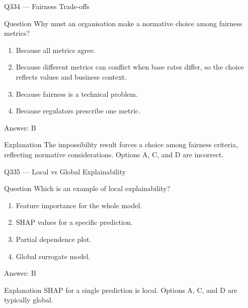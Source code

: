 \documentclass[aspectratio=169,8pt]{beamer}
\begin{document}
\begin{frame}{Q334 --- Fairness Trade-offs}
	\begin{block}{Question}
		Why must an organisation make a normative choice among fairness metrics?
		\begin{enumerate}
			\item Because all metrics agree.
			\item Because different metrics can conflict when base rates differ, so the choice reflects values and business context.
			\item Because fairness is a technical problem.
			\item Because regulators prescribe one metric.
	\end{enumerate}  \end{block}
	\begin{exampleblock}{Answer: B}\end{exampleblock}
	\begin{block}{Explanation}
		The impossibility result forces a choice among fairness criteria, reflecting normative considerations. Options A, C, and D are incorrect.
	\end{block}
\end{frame}

\begin{frame}{Q335 --- Local vs Global Explainability}
	\begin{block}{Question}
		Which is an example of local explainability?
		\begin{enumerate}
			\item Feature importance for the whole model.
			\item SHAP values for a specific prediction.
			\item Partial dependence plot.
			\item Global surrogate model.
	\end{enumerate}  \end{block}
	\begin{exampleblock}{Answer: B}\end{exampleblock}
	\begin{block}{Explanation}
		SHAP for a single prediction is local. Options A, C, and D are typically global.
	\end{block}
\end{frame}
\end{document}
